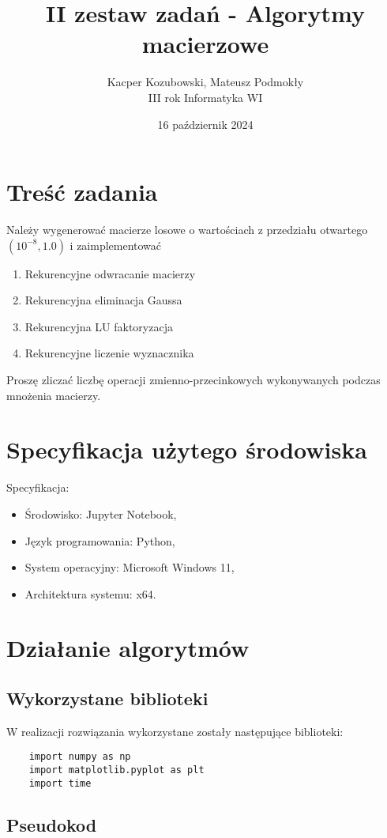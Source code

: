 \documentclass[11pt, leqno]{scrartcl}
\title{II zestaw zadań - Algorytmy macierzowe}
\author{Kacper Kozubowski, Mateusz Podmokły \\ III
    rok Informatyka WI}
\date{16 październik 2024}
\begin{document}
    \maketitle
    \section{Treść zadania}
    Należy wygenerować macierze losowe o wartościach
    z przedziału otwartego $(10^{-8},1.0)$
    i zaimplementować
    \begin{enumerate}
        \item Rekurencyjne odwracanie macierzy
        \item Rekurencyjna eliminacja Gaussa
        \item Rekurencyjna LU faktoryzacja
        \item Rekurencyjne liczenie wyznacznika
    \end{enumerate}
    Proszę zliczać liczbę operacji zmienno-przecinkowych
    wykonywanych podczas mnożenia macierzy.

    \section{Specyfikacja użytego środowiska}
    Specyfikacja:
    \begin{itemize}
        \item Środowisko: Jupyter Notebook,
        \item Język programowania: Python,
        \item System operacyjny: Microsoft Windows 11,
        \item Architektura systemu: x64.
    \end{itemize}

    \section{Działanie algorytmów}
    \subsection{Wykorzystane biblioteki}
    W realizacji rozwiązania wykorzystane zostały następujące
    biblioteki:
    \begin{lstlisting}
    import numpy as np
    import matplotlib.pyplot as plt
    import time
    \end{lstlisting}
    \subsection{Pseudokod}
    
\end{document}
